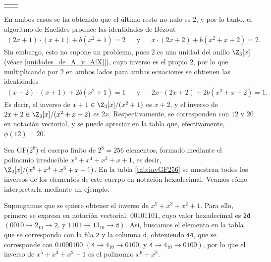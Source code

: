 \begin{ejs}
\begin{center}
\begin{tabular}{cc}
\begin{minipage}[t]{0.4\textwidth}
                \end{minipage}
            \end{tabular}
        \end{center}
        En ambos casos se ha obtenido que el último resto no nulo es $2$, y por lo tanto, el algoritmo de Euclides produce las identidades de Bézout
        \begin{align*}
            (2x+1)\cdot (x + 1) + b(x^2 + 1) = 2 && \text{y} && x\cdot (2x+2) + b(x^2+x+2) = 2.
        \end{align*}
         Sin embargo, esto no supone un problema, pues $2$ es una unidad del anillo $\Z_3[x]$ (véase \ref{unidades_de_A_y_A[X]}), cuyo inverso es el propio $2$, por lo que multiplicando por $2$ en ambos lados para ambas ecuaciones se obtienen las identidades
         \begin{align*}
            (x+2)\cdot (x + 1) + 2b(x^2 + 1) = 1 && \text{y} && 2x\cdot (2x+2) + 2b(x^2+x+2) = 1.
        \end{align*}
         Es decir, el inverso de $x + 1 \in \Z_3[x]/(x^2 + 1)$ es $x + 2 $, y el inverso de $2x + 2 \in \Z_3[x]/(x^2 + x + 2) $ es $2x$. Respectivamente, se corresponden con $12$ y $20$ en notación vectorial, y se puede apreciar en la tabla que, efectivamente, $\phi(12) = 20$.
    
    \item Sea GF($2^8$) el cuerpo finito de $2^8 = 256$ elementos, formado mediante el polinomio irreducible $x^8 + x^4 + x^3 + x + 1$, es decir, $\Z_2[x]/(x^8 + x^4 + x^3 + x + 1)$. En la tabla \ref{tab:invGF256} se muestran todos los inversos de los elementos de este cuerpo en notación hexadecimal. Veamos cómo interpretarla mediante un ejemplo:
    
    Supongamos que se quiere obtener el inverso de $x^5 + x^3 +x^2+ 1$. Para ello, primero se expresa en notación vectorial: $00101101$, cuyo valor hexadecimal es \texttt{2d} $(0010\to 2_{10} \to\texttt{2} \text{, y } 1101\to 13_{10} \to\texttt{d})$. Así, buscamos el elemento en la tabla que se corresponda con la fila \texttt{2} y la columna \texttt{d}, obteniendo \texttt{44}, que se corresponde con $01000100$ $(\texttt{4}\to 4_{10} \to 0100\text{, y } \texttt{4}\to 4_{10} \to 0100)$, por lo que el inverso de $x^5 + x^3 +x^2+ 1$ es el polinomio $x^6 + x^2$.


\end{ejs}
